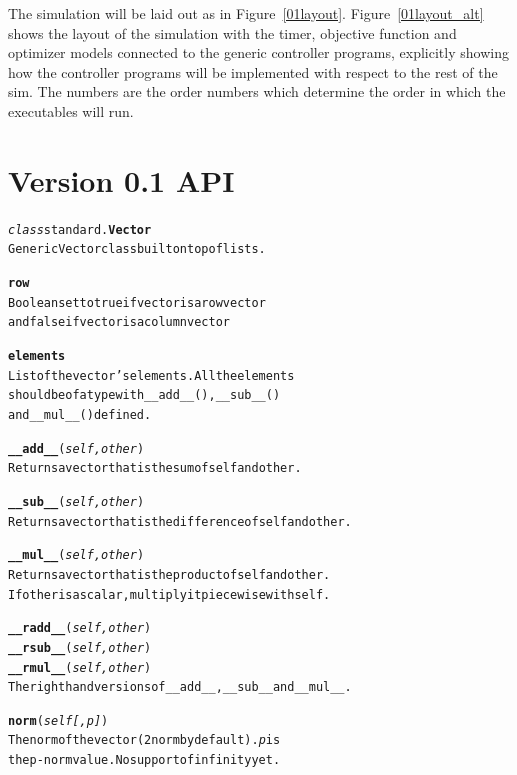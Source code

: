 \documentclass{book}
\begin{document}
The simulation will be laid out as in Figure~\ref{01layout}. Figure~\ref{01layout_alt} shows the layout of the simulation with the timer, objective function and optimizer models connected to the generic controller programs, explicitly showing how the controller programs will be implemented with respect to the rest of the sim. The numbers are the order numbers which determine the order in which the executables will run.

\section{Version 0.1 API}
\begin{alltt}
\emph{class} standard.\textbf{Vector}
    Generic Vector class built on top of lists.

    \textbf{row}
        Boolean set to true if vector is a row vector 
        and false if vector is a column vector

    \textbf{elements}
         List of the vector's elements. All the elements
         should be of a type with  __add__(), __sub__() 
         and __mul__() defined.

    \textbf{__add__}( \emph{ self, other} )
         Returns a vector that is the sum of self and other.

    \textbf{__sub__}( \emph{ self, other} )
         Returns a vector that is the difference of self and other.

    \textbf{__mul__}( \emph{ self, other} )
         Returns a vector that is the product of self and other.
         If other is a scalar, multiply it piecewise with self.

    \textbf{__radd__}( \emph{ self, other} )
    \textbf{__rsub__}( \emph{ self, other} )
    \textbf{__rmul__}( \emph{ self, other} )
        The right hand versions of __add__, __sub__ and __mul__.

    \textbf{norm}(\emph{self[,p]})
        The norm of the vector (2 norm by default). \emph{p} is
         the p-norm value. No support of infinity yet.



	
\end{alltt}
\end{document}
